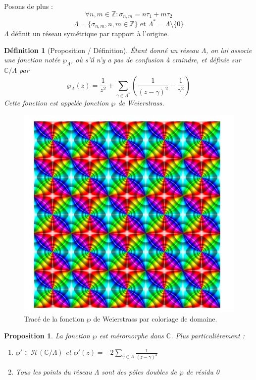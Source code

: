 \documentclass[12pt]{article}
\newtheorem{definition}{Définition}
\newtheorem{proposition}{Proposition}
\begin{document}
    Posons de plus :
    \[
    \forall n, m \in \mathbb{Z} : \sigma_{n, m} = n\tau_1 + m\tau_2
    \]
    \[
    \Lambda = \{\sigma_{n, m}, n, m \in \mathbb{Z}\} \text{ et } \Lambda^* = \Lambda \setminus \{0\}
    \]
    $\Lambda$ définit un réseau symétrique par rapport à l'origine.

    \begin{definition}[Proposition / Définition]
    Étant donné un réseau \( \Lambda \), on lui associe une fonction notée \( \wp_\Lambda \), où s'il n'y a pas de confusion à craindre, et définie sur \( \mathbb{C}/\Lambda \) par
    \[
        \wp_\Lambda(z) = \frac{1}{z^2} + \sum_{\gamma \in \Lambda^*} \left( \frac{1}{(z - \gamma)^2} - \frac{1}{\gamma^2} \right)
    \]
    Cette fonction est appelée fonction \( \wp \) de Weierstrass.
    \end{definition}

    \begin{figure}
        \centering
        \includegraphics[width=\linewidth]{weierstrass_function.jpeg}
        \caption{Tracé de la fonction $\wp$ de Weierstrass par coloriage de domaine.}
    \end{figure}

    \newpage
    \begin{proposition}
    La fonction \( \wp \) est méromorphe dans \( \mathbb{C} \). Plus particulièrement :
    \begin{enumerate}
        \item \( \wp' \in \mathcal{H}\left( \mathbb{C}/\Lambda \right)\) et \( \wp'(z) = -2 \sum_{\gamma \in \Lambda} \frac{1}{(z - \gamma)^3} \)
        \item Tous les points du réseau \( \Lambda \) sont des pôles doubles de \( \wp \) de résidu 0
    \end{enumerate}
    \end{proposition}
\end{document}
